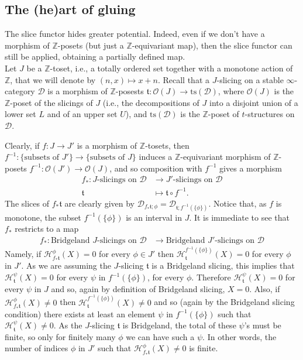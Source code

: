 \documentclass{article}
\theoremstyle{definition}
\newcommand{\Z}{\mathbb{Z}}
\newcommand{\Oo}{\mathcal{O}}
\newcommand{\ts}{\mathrm{ts}}
\newcommand{\tee}{\mathfrak{t}}
\begin{document}
\begin{titlepage}
\end{titlepage}




\subsection{The (he)art of gluing} The slice functor hides greater potential. Indeed, even if we don't have a morphism of $\mathbb{Z}$-posets (but just a $\mathbb{Z}$-equivariant map), then the slice functor can still be applied, obtaining a partially defined map. \\

Let $J$ be a $\Z$-toset, i.e., a totally ordered set together with a monotone action of $\Z$, that we will denote by $(n,x)\mapsto x+n$. Recall that a $J$-slicing on a stable $\infty$-category $\mathscr{D}$ is a morphism of $\Z$-posests $\tee\colon \Oo(J)\to \ts(\mathscr{D})$, where $\Oo(J)$ is the $\Z$-poset of the slicings of $J$ (i.e., the decompositions of $J$ into a disjoint union of a lower set $L$ and of an upper set $U$), and $\ts(\mathscr{D})$ is the $\Z$-poset of $t$-structures on $\mathscr{D}$.

Clearly, if $f\colon J\to J'$ is a morphism of $\Z$-tosets, then $f^{-1}\colon \{\text{subsets of $J'$}\}\to \{\text{subsets of $J$}\}$ induces a $\Z$-equivariant morphism of $\Z$-posets $f^{-1}\colon \Oo(J')\to \Oo(J)$, and so composition with $f^{-1}$ gives a morphism
\begin{align*}
f_*\colon J\text{-slicings on $\mathscr{D}$}&\to J'\text{-slicings on $\mathscr{D}$}\\
\tee&\mapsto \tee\circ f^{-1}.
\end{align*}
The slices of $f_*\tee$ are clearly given by $\mathscr{D}_{f_*\tee;\phi}=\mathscr{D}_{\tee;f^{-1}(\{\phi\})}$. Notice that, as $f$ is monotone, the subset $f^{-1}(\{\phi\})$ is an interval in $J$. It is immediate to see that $f_*$ restricts to a map
\begin{align*}
f_*\colon \text{Bridgeland $J$-slicings on $\mathscr{D}$}&\to \text{Bridgeland $J'$-slicings on $\mathscr{D}$}
\end{align*}
Namely, if $\mathcal{H}^\phi_{f_*\tee}(X)=0$ for every $\phi\in J'$ then $\mathcal{H}^{f^{-1}(\{\phi\})}_{\tee}(X)=0$ for every $\phi$ in $J'$. As we are assuming the $J$-slicing $\tee$ is a Bridgeland slicing, this implies that $\mathcal{H}^{\psi}_{\tee}(X)=0$ for every $\psi$ in $f^{-1}(\{\phi\})$, for every $\phi$. Therefore $\mathcal{H}^{\psi}_{\tee}(X)=0$ for every $\psi$ in $J$ and so, again by definition of Bridgeland slicing, $X=0$. Also, if $\mathcal{H}^\phi_{f_*\tee}(X)\neq 0$ then $\mathcal{H}^{f^{-1}(\{\phi\})}_{\tee}(X)\neq 0$ and so (again by the Bridgeland slicing condition) there exists at least an element $\psi$ in $f^{-1}(\{\phi\})$ such that $\mathcal{H}^{\psi}_{\tee}(X)\neq 0$. As the $J$-slicing $\tee$ is Bridgeland, the total of these $\psi$'s must be finite, so only for finitely many $\phi$ we can have such a $\psi$. In other words, the number of indices $\phi$ in $J'$ such that $\mathcal{H}^\phi_{f_*\tee}(X)\neq 0$ is finite.
\end{document}
